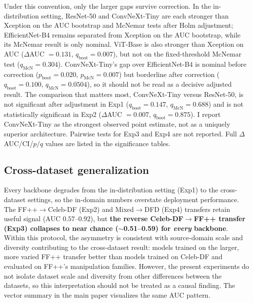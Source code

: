 Under this convention, only the larger gaps survive correction. In the in-distribution setting, ResNet-50 and ConvNeXt-Tiny are each stronger than Xception on the AUC bootstrap and McNemar tests after Holm adjustment; EfficientNet-B4 remains separated from Xception on the AUC bootstrap, while its McNemar result is only nominal. ViT-Base is also stronger than Xception on AUC ($\Delta$AUC $=0.131$, $q_{\mathrm{boot}}\!=\!0.007$), but not on the fixed-threshold McNemar test ($q_{\mathrm{McN}}\!=\!0.304$). ConvNeXt-Tiny's gap over EfficientNet-B4 is nominal before correction ($p_{\mathrm{boot}}\!=\!0.020$, $p_{\mathrm{McN}}\!=\!0.007$) but borderline after correction ($q_{\mathrm{boot}}\!=\!0.100$, $q_{\mathrm{McN}}\!=\!0.0504$), so it should not be read as a decisive adjusted result. The comparison that matters most, ConvNeXt-Tiny versus ResNet-50, is not significant after adjustment in Exp1 ($q_{\mathrm{boot}}\!=\!0.147$, $q_{\mathrm{McN}}\!=\!0.688$) and is not statistically significant in Exp2 ($\Delta$AUC $=0.007$, $q_{\mathrm{boot}}\!=\!0.875$). I report ConvNeXt-Tiny as the strongest observed point estimate, not as a uniquely superior architecture. Pairwise tests for Exp3 and Exp4 are not reported. Full $\Delta$AUC/CI/$p/q$ values are listed in the significance tables.



\subsection{Cross-dataset generalization}
Every backbone degrades from the in-distribution setting (Exp1) to the cross-dataset settings, so the in-domain numbers overstate deployment performance. The FF++$\to$Celeb-DF (Exp2) and Mixed$\to$DFD (Exp4) transfers retain useful signal (AUC $0.57$--$0.92$), but \textbf{the reverse Celeb-DF$\to$FF++ transfer (Exp3) collapses to near chance ($\sim$0.51--0.59) for \emph{every} backbone}. Within this protocol, the asymmetry is consistent with source-domain scale and diversity contributing to the cross-dataset result: models trained on the larger, more varied FF++ transfer better than models trained on Celeb-DF and evaluated on FF++'s manipulation families. However, the present experiments do not isolate dataset scale and diversity from other differences between the datasets, so this interpretation should not be treated as a causal finding. The vector summary in the main paper visualizes the same AUC pattern.

